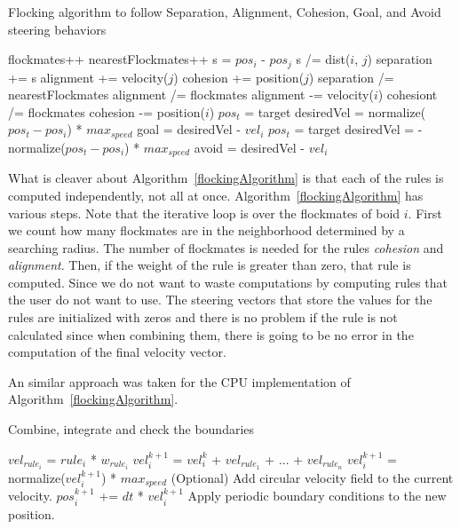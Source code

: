 \begin{algorithm}
\caption{Flocking algorithm to follow Separation, Alignment, Cohesion, Goal, and Avoid steering behaviors}
\label{flockingAlgorithm}
\begin{algorithmic}
	\STATE flockmates++
				\STATE nearestFlockmates++
				\STATE s = $pos_i$ - $pos_j$ 
				\STATE s /= dist($i$, $j$) 
				\STATE separation += s
			\ENDIF
		\ENDIF
			\STATE alignment += velocity($j$)
		\ENDIF
			\STATE cohesion += position($j$)
		\ENDIF
	\ENDIF
\ENDFOR
{}
	\STATE separation /= nearestFlockmates
\ENDIF
{}
	\STATE alignment /=  flockmates
	\STATE alignment -= velocity($i$)
\ENDIF
{}
	\STATE cohesiont /=  flockmates
	\STATE cohesion -= position($i$)
\ENDIF
{}
	\STATE $pos_t$ = target
	\STATE desiredVel = normalize($pos_t - pos_i$) * $max_{speed}$
	\STATE goal = desiredVel - $vel_i$
\ENDIF
{}
	\STATE $pos_t$ = target
	\STATE desiredVel = -normalize($pos_t - pos_i$) * $max_{speed}$
	\STATE avoid = desiredVel - $vel_i$
\ENDIF

\end{algorithmic}
\end{algorithm}

What is cleaver about Algorithm~\ref{flockingAlgorithm} is that each of the rules is computed independently, not all at once. Algorithm~\ref{flockingAlgorithm} has various steps. Note that the iterative loop is over the flockmates of boid $i$. First we count how many flockmates are in the neighborhood determined by a searching radius. The number of flockmates is needed for the rules \textit{cohesion} and \textit{alignment}. Then, if the weight of the rule is greater than zero, that rule is computed. Since we do not want to waste computations by computing rules that the user do not want to use. The steering vectors that store the values for the rules are initialized with zeros and there is no problem if the rule is not calculated since when combining them, there is going to be no error in the computation of the final velocity vector.

An similar approach was taken for the CPU implementation of Algorithm~\ref{flockingAlgorithm}.

\begin{algorithm}
\caption{Combine, integrate and check the boundaries}
\label{combineAlgorithm}
\begin{algorithmic}
\STATE $vel_{rule_i}$  = $rule_i$ * $w_{rule_i}$ 
\STATE $vel_i^{k+1}$ = $vel_i^k$ + $vel_{rule_1}$ + ... + $vel_{rule_n}$
	\STATE $vel_i^{k+1}$ = normalize($vel_i^{k+1}$) * $max_{speed}$
\ENDIF  
\STATE (Optional) Add circular velocity field to the current velocity.
\STATE $pos_i^{k+1}$ += $dt$ * $vel_i^{k+1}$
\STATE Apply periodic boundary conditions to the new position.
\end{algorithmic}
\end{algorithm}

